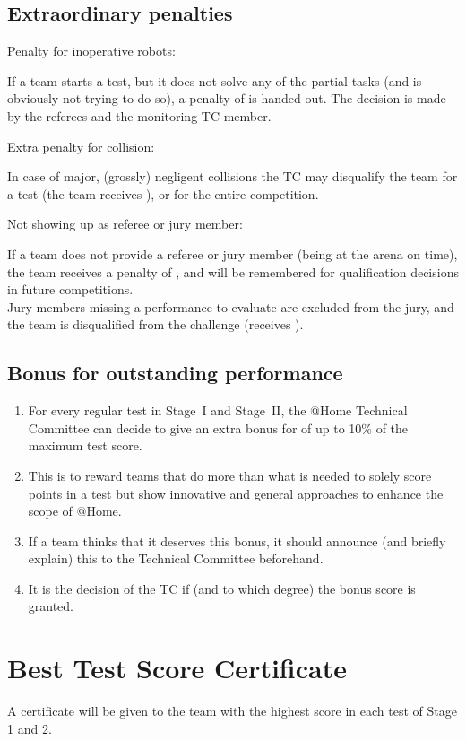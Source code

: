 \subsection{Extraordinary penalties}\label{rule:extraordinary_penalties}
\begin{enumerate}
{\bf\item Penalty for inoperative robots:} If a team starts a test, but it does not solve any of the partial tasks
(and is obviously not trying to do so), a penalty of  is handed out. 
The decision is made by the referees and the monitoring TC member.  
{\bf\item Extra penalty for collision:} In case of major, (grossly) negligent collisions the TC may disqualify the team for 
a test (the team receives ), or for the entire competition.
{\bf\item Not showing up as referee or jury member:}
If a team does not provide a referee or jury member (being at the arena on time), the team receives a penalty
of , and will be remembered for qualification decisions in future competitions.\\
Jury members missing a performance to evaluate are excluded from the jury, and the team is 
disqualified from the challenge (receives ).
\end{enumerate}

\subsection{Bonus for outstanding performance}\label{rule:outstanding_performance}
\begin{enumerate}
\item For every regular test in Stage~I and Stage~II, the @Home Technical
Committee can decide to give an extra bonus for  
of up to 10\% of the maximum test score. 
\item This is to reward teams that do more than what is needed to solely score points in a
test but show innovative and general approaches to enhance the scope of @Home. 
\item If a team thinks that it deserves this bonus, it should announce (and briefly explain) 
this to the Technical Committee beforehand.
\item It is the decision of the TC if (and to which degree) the bonus score is granted.
\end{enumerate}


\section{Best Test Score Certificate}\label{sec:best_score_certificate}
A certificate will be given to the team with the highest score in each test of Stage 1 and 2. 

